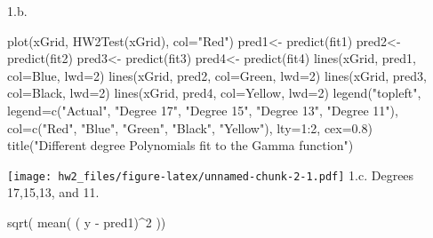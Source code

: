 \documentclass[
]{article}
\newenvironment{Shaded}{\begin{snugshade}}{\end{snugshade}}
\newcommand{\AttributeTok}[1]{\textcolor[rgb]{0.77,0.63,0.00}{#1}}
\newcommand{\DecValTok}[1]{\textcolor[rgb]{0.00,0.00,0.81}{#1}}
\newcommand{\FloatTok}[1]{\textcolor[rgb]{0.00,0.00,0.81}{#1}}
\newcommand{\FunctionTok}[1]{\textcolor[rgb]{0.00,0.00,0.00}{#1}}
\newcommand{\NormalTok}[1]{#1}
\newcommand{\OtherTok}[1]{\textcolor[rgb]{0.56,0.35,0.01}{#1}}
\newcommand{\SpecialCharTok}[1]{\textcolor[rgb]{0.00,0.00,0.00}{#1}}
\newcommand{\StringTok}[1]{\textcolor[rgb]{0.31,0.60,0.02}{#1}}
\begin{document}
1.b.

\begin{Shaded}
\begin{Highlighting}[]
\FunctionTok{plot}\NormalTok{(xGrid, }\FunctionTok{HW2Test}\NormalTok{(xGrid), }\AttributeTok{col=}\StringTok{"Red"}\NormalTok{)}
\NormalTok{pred1}\OtherTok{\textless{}{-}} \FunctionTok{predict}\NormalTok{(fit1)}
\NormalTok{pred2}\OtherTok{\textless{}{-}} \FunctionTok{predict}\NormalTok{(fit2)}
\NormalTok{pred3}\OtherTok{\textless{}{-}} \FunctionTok{predict}\NormalTok{(fit3)}
\NormalTok{pred4}\OtherTok{\textless{}{-}} \FunctionTok{predict}\NormalTok{(fit4)}
\FunctionTok{lines}\NormalTok{(xGrid, pred1, }\AttributeTok{col=}\StringTok{\textquotesingle{}Blue\textquotesingle{}}\NormalTok{, }\AttributeTok{lwd=}\DecValTok{2}\NormalTok{)}
\FunctionTok{lines}\NormalTok{(xGrid, pred2, }\AttributeTok{col=}\StringTok{\textquotesingle{}Green\textquotesingle{}}\NormalTok{, }\AttributeTok{lwd=}\DecValTok{2}\NormalTok{)}
\FunctionTok{lines}\NormalTok{(xGrid, pred3, }\AttributeTok{col=}\StringTok{\textquotesingle{}Black\textquotesingle{}}\NormalTok{, }\AttributeTok{lwd=}\DecValTok{2}\NormalTok{)}
\FunctionTok{lines}\NormalTok{(xGrid, pred4, }\AttributeTok{col=}\StringTok{\textquotesingle{}Yellow\textquotesingle{}}\NormalTok{, }\AttributeTok{lwd=}\DecValTok{2}\NormalTok{)}
\FunctionTok{legend}\NormalTok{(}\StringTok{"topleft"}\NormalTok{, }\AttributeTok{legend=}\FunctionTok{c}\NormalTok{(}\StringTok{"Actual"}\NormalTok{, }\StringTok{"Degree 17"}\NormalTok{, }\StringTok{"Degree 15"}\NormalTok{, }\StringTok{"Degree 13"}\NormalTok{, }\StringTok{"Degree 11"}\NormalTok{),}
       \AttributeTok{col=}\FunctionTok{c}\NormalTok{(}\StringTok{"Red"}\NormalTok{, }\StringTok{"Blue"}\NormalTok{, }\StringTok{"Green"}\NormalTok{, }\StringTok{"Black"}\NormalTok{, }\StringTok{"Yellow"}\NormalTok{), }\AttributeTok{lty=}\DecValTok{1}\SpecialCharTok{:}\DecValTok{2}\NormalTok{, }\AttributeTok{cex=}\FloatTok{0.8}\NormalTok{)}
\FunctionTok{title}\NormalTok{(}\StringTok{"Different degree Polynomials fit to the Gamma function"}\NormalTok{)}
\end{Highlighting}
\end{Shaded}

\texttt{[image: hw2\_files/figure-latex/unnamed-chunk-2-1.pdf]} 1.c.
Degrees 17,15,13, and 11.

\begin{Shaded}
\begin{Highlighting}[]
\FunctionTok{sqrt}\NormalTok{( }\FunctionTok{mean}\NormalTok{( ( y }\SpecialCharTok{{-}}\NormalTok{ pred1)}\SpecialCharTok{\^{}}\DecValTok{2}\NormalTok{ ))}
\end{Highlighting}
\end{Shaded}
\end{document}
